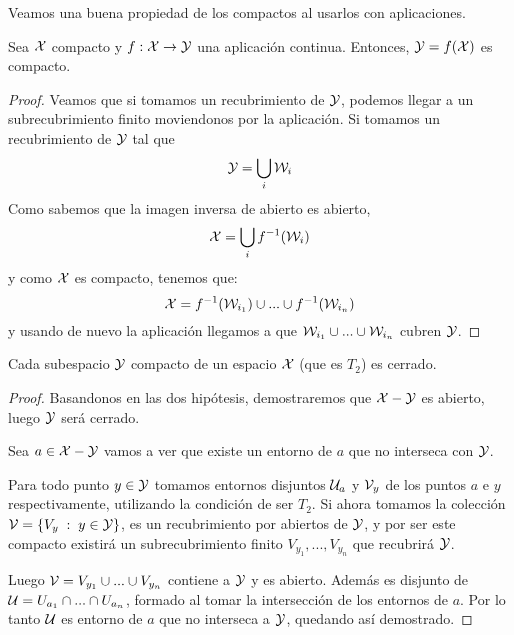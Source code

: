 Veamos una buena propiedad de los compactos al usarlos con aplicaciones.


\begin{prop}
	\label{comp_comp_comp}
	Sea $\mathcal{X}$ compacto y $f:\mathcal{X} \rightarrow \mathcal{Y}$ una aplicación continua. Entonces, $\mathcal{Y} = f(\mathcal{X})$ es compacto.
	\begin{proof}
		Veamos que si tomamos un recubrimiento de $\mathcal{Y}$, podemos llegar a un subrecubrimiento finito moviendonos por la aplicación. Si tomamos un recubrimiento de $\mathcal{Y}$ tal que
		\begin{equation*}
			\mathcal{Y} = \bigcup_{i}\mathcal{W}_i
		\end{equation*}
		Como sabemos que la imagen inversa de abierto es abierto,
		\begin{equation*}
			\mathcal{X} = \bigcup_{i}f^{-1}(\mathcal{W}_i)
		\end{equation*}
		y como $\mathcal{X}$ es compacto, tenemos que:
		\begin{equation*}
			\mathcal{X}  = f^{-1}(\mathcal{W}_{i_1}) \cup ... \cup f^{-1}(\mathcal{W}_{i_n})
		\end{equation*}
		y usando de nuevo la aplicación llegamos a que $\mathcal{W}_{i_1} \cup ... \cup \mathcal{W}_{i_n}$ cubren $\mathcal{Y}$.
	\end{proof}
\end{prop}


\begin{prop}
	Cada subespacio $\mathcal{Y}$ compacto de un espacio $\mathcal{X}$ (que es $T_2$) es cerrado.
	\begin{proof}
		Basandonos en las dos hipótesis, demostraremos que $\mathcal{X} - \mathcal{Y}$ es abierto, luego $\mathcal{Y}$ será cerrado.
		
		Sea $a \in \mathcal{X}-\mathcal{Y}$ vamos a ver que existe un entorno de $a$ que no interseca con $\mathcal{Y}$.
		
		Para todo punto $y \in \mathcal{Y}$ tomamos entornos disjuntos $\mathcal{U}_a$ y $\mathcal{V}_y$ de los puntos $a$ e $y$ respectivamente, utilizando la condición de ser $T_2$. Si ahora tomamos la colección $\mathcal{V} = \{V_y \;:\; y \in \mathcal{Y}\}$, es un recubrimiento por abiertos de $\mathcal{Y}$, y por ser este compacto existirá un subrecubrimiento finito $V_{y_1}, ..., V_{y_n}$ que recubrirá $\mathcal{Y}$.
		
		Luego $\mathcal{V} = V_{y_1} \cup ... \cup V_{y_n}$ contiene a $\mathcal{Y}$ y es abierto. Además es disjunto de $\mathcal{U} = U_{a_1} \cap ... \cap U_{a_n}$, formado al tomar la intersección de los entornos de $a$. Por lo tanto $\mathcal{U}$ es entorno de $a$ que no interseca a $\mathcal{Y}$, quedando así demostrado.
	\end{proof}
\end{prop}


